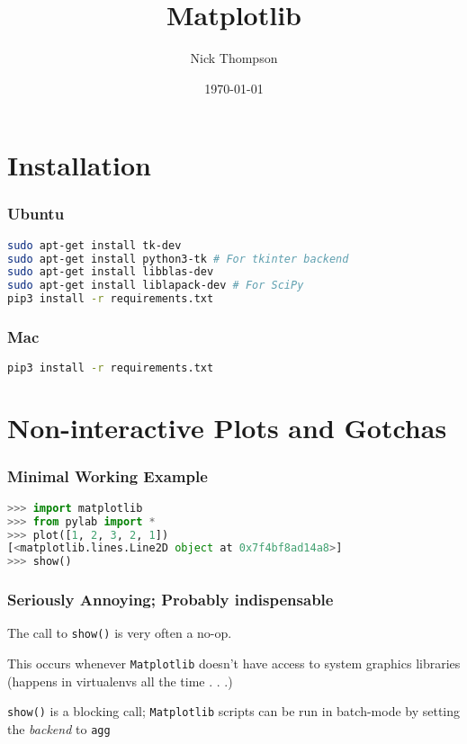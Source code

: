 \documentclass{beamer}
\begin{document}
\title{Matplotlib}
\author{Nick Thompson} 
\date{\today} 

\frame{\titlepage} 



\section{Installation} 

\begin{frame}[fragile]
\frametitle{Ubuntu}

\begin{lstlisting}[language=bash]
sudo apt-get install tk-dev
sudo apt-get install python3-tk # For tkinter backend
sudo apt-get install libblas-dev
sudo apt-get install liblapack-dev # For SciPy
pip3 install -r requirements.txt
\end{lstlisting}
\end{frame}

\begin{frame}[fragile]
\frametitle{Mac}
\begin{lstlisting}[language=bash]
pip3 install -r requirements.txt
\end{lstlisting}
\end{frame}

\section{Non-interactive Plots and Gotchas}
\begin{frame}[fragile]
\frametitle{Minimal Working Example}
\begin{lstlisting}[language=Python]
>>> import matplotlib
>>> from pylab import *
>>> plot([1, 2, 3, 2, 1])
[<matplotlib.lines.Line2D object at 0x7f4bf8ad14a8>]
>>> show()
\end{lstlisting}
\end{frame}

\begin{frame}
\frametitle{Seriously Annoying; Probably indispensable}
The call to \texttt{show()} is very often a no-op.

This occurs whenever \texttt{Matplotlib} doesn't have access to system graphics libraries (happens in virtualenvs all the time . . .)

\texttt{show()} is a blocking call; \texttt{Matplotlib} scripts can be run in batch-mode by setting the \emph{backend} to \texttt{agg}
\end{frame}
\end{document}
